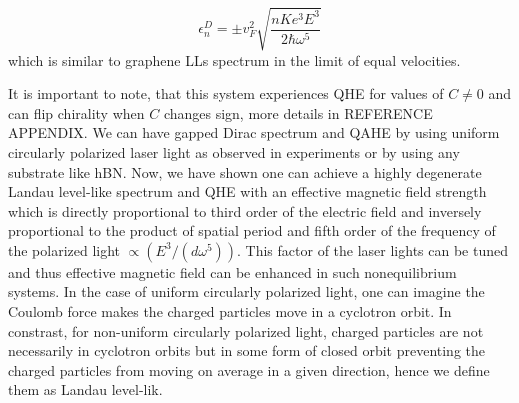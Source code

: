 \begin{equation} \label{eq:DiracEner}
  \epsilon_{n}^D = \pm v_F^2 \sqrt{\dfrac{nK e^3 E^3}{2 \hbar \omega^5}}
\end{equation}
which is similar to graphene LLs spectrum in the limit of equal velocities.

It is important to note, that this system experiences QHE for values of $C\neq0$ and can flip chirality when $C$ changes sign, more details in REFERENCE APPENDIX.
We can have gapped Dirac spectrum and QAHE by using uniform circularly polarized laser light as observed in experiments \cite{YHW, JWM} or by using any substrate like hBN.
Now, we have shown one can achieve a highly degenerate Landau level-like spectrum and QHE with an effective magnetic field strength which is directly proportional to third order of the electric field and inversely proportional to the product of spatial period and fifth order of the frequency of the polarized light $\propto (E^3/(d\omega^5))$.
This factor of the laser lights can be tuned and thus effective magnetic field can be enhanced in such nonequilibrium systems.
In the case of uniform circularly polarized light, one can imagine the Coulomb force makes the charged particles move in a cyclotron orbit.
In constrast, for non-uniform circularly polarized light, charged particles are not necessarily in cyclotron orbits but in some form of closed orbit preventing the charged particles from moving on average in a given direction, hence we define them as Landau level-lik.

